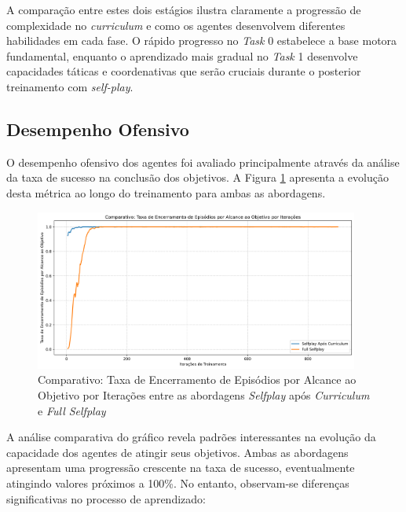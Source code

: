 A comparação entre estes dois estágios ilustra claramente a progressão de complexidade no \textit{curriculum} e como os agentes desenvolvem diferentes habilidades em cada fase. O rápido progresso no \textit{Task} 0 estabelece a base motora fundamental, enquanto o aprendizado mais gradual no \textit{Task} 1 desenvolve capacidades táticas e coordenativas que serão cruciais durante o posterior treinamento com \textit{self-play}.

\subsection{Desempenho Ofensivo}

O desempenho ofensivo dos agentes foi avaliado principalmente através da análise da taxa de sucesso na conclusão dos objetivos. A Figura \ref{fig:goals_blue_comparison} apresenta a evolução desta métrica ao longo do treinamento para ambas as abordagens.

\begin{figure}[H]
    \centering
    \includegraphics[width=0.95\textwidth]{fig/graficos_trabalho/graficos_experimentos/geral/comparativo_taxa_encerramento_episodios.png}
    \caption{Comparativo: Taxa de Encerramento de Episódios por Alcance ao Objetivo por Iterações entre as abordagens \textit{Selfplay} após \textit{Curriculum} e \textit{Full Selfplay}}
    \label{fig:goals_blue_comparison}
\end{figure}

A análise comparativa do gráfico revela padrões interessantes na evolução da capacidade dos agentes de atingir seus objetivos. Ambas as abordagens apresentam uma progressão crescente na taxa de sucesso, eventualmente atingindo valores próximos a 100\%. No entanto, observam-se diferenças significativas no processo de aprendizado:


